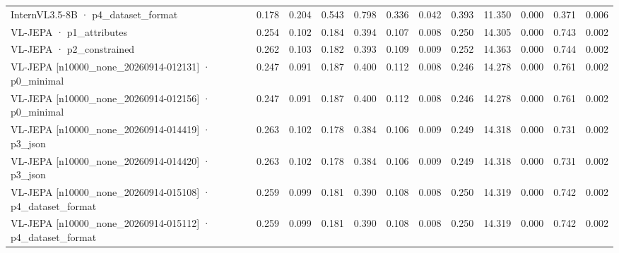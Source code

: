 \begin{tabular}{lrrrrrrrrrrr}
InternVL3.5-8B · p4\_dataset\_format & 0.178 & 0.204 & 0.543 & 0.798 & 0.336 & 0.042 & 0.393 & 11.350 & 0.000 & 0.371 & 0.006 \\
VL-JEPA · p1\_attributes & 0.254 & 0.102 & 0.184 & 0.394 & 0.107 & 0.008 & 0.250 & 14.305 & 0.000 & 0.743 & 0.002 \\
VL-JEPA · p2\_constrained & 0.262 & 0.103 & 0.182 & 0.393 & 0.109 & 0.009 & 0.252 & 14.363 & 0.000 & 0.744 & 0.002 \\
VL-JEPA [n10000\_none\_20260914-012131] · p0\_minimal & 0.247 & 0.091 & 0.187 & 0.400 & 0.112 & 0.008 & 0.246 & 14.278 & 0.000 & 0.761 & 0.002 \\
VL-JEPA [n10000\_none\_20260914-012156] · p0\_minimal & 0.247 & 0.091 & 0.187 & 0.400 & 0.112 & 0.008 & 0.246 & 14.278 & 0.000 & 0.761 & 0.002 \\
VL-JEPA [n10000\_none\_20260914-014419] · p3\_json & 0.263 & 0.102 & 0.178 & 0.384 & 0.106 & 0.009 & 0.249 & 14.318 & 0.000 & 0.731 & 0.002 \\
VL-JEPA [n10000\_none\_20260914-014420] · p3\_json & 0.263 & 0.102 & 0.178 & 0.384 & 0.106 & 0.009 & 0.249 & 14.318 & 0.000 & 0.731 & 0.002 \\
VL-JEPA [n10000\_none\_20260914-015108] · p4\_dataset\_format & 0.259 & 0.099 & 0.181 & 0.390 & 0.108 & 0.008 & 0.250 & 14.319 & 0.000 & 0.742 & 0.002 \\
VL-JEPA [n10000\_none\_20260914-015112] · p4\_dataset\_format & 0.259 & 0.099 & 0.181 & 0.390 & 0.108 & 0.008 & 0.250 & 14.319 & 0.000 & 0.742 & 0.002 \\
\bottomrule
\end{tabular}
